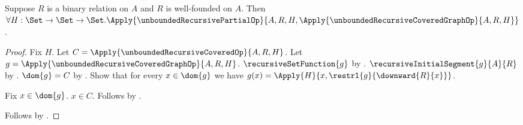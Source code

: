 \begin{theorem}\label{unbounded_recursive_covered_graph_partial}
    Suppose $R$ is a binary relation on $A$ and $R$ is well-founded on $A$.
    Then $\forall H:\Set\to\Set\to\Set.
        \Apply{\unboundedRecursivePartialOp}
            {A,R,H,\Apply{\unboundedRecursiveCoveredGraphOp}
                {A,R,H}}$.
\end{theorem}
\begin{proof}
    Fix $H$.
    Let $C=\Apply{\unboundedRecursiveCoveredOp}
        {A,R,H}$.
    Let $g=\Apply{\unboundedRecursiveCoveredGraphOp}
        {A,R,H}$.
    $\recursiveSetFunction{g}$ by
        .
    $\recursiveInitialSegment{g}{A}{R}$ by
        .
    $\dom{g}=C$ by
        .
    Show that for every $x\in\dom{g}$ we have
        $g(x)=\Apply{H}{x,
            \restrl{g}{\downward{R}{x}}}$.
    \begin{subproof}
        Fix $x\in\dom{g}$.
        $x\in C$.
        Follows by
            .
    \end{subproof}
    Follows by .
\end{proof}

